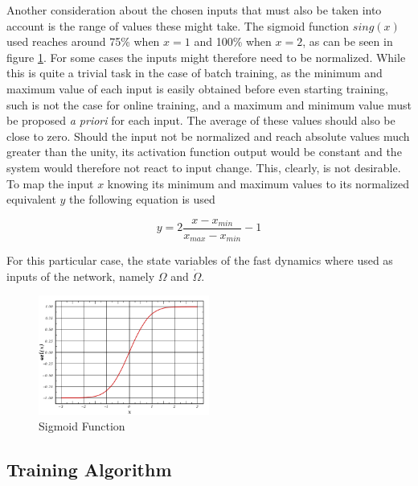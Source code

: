 Another consideration about the chosen inputs that must also be taken into account is the range of values these might take. The sigmoid function $sing(x)$ used reaches around 75\% when $x=1$ and 100\% when $x=2$, as can be seen in figure \ref{fig:sigmoid}. For some cases the inputs might therefore need to be normalized. While this is quite a trivial task in the case of batch training, as the minimum and maximum value of each input is easily obtained before even starting training, such is not the case for online training, and a maximum and minimum value must be proposed \emph{a priori} for each input. The average of these values should also be close to zero. Should the input not be normalized and reach absolute values much greater than the unity, its activation function output would be constant and the system would therefore not react to input change. This, clearly, is not desirable. To map the input $x$ knowing its minimum and maximum values to its normalized equivalent $y$ the following equation is used

\begin{equation}
y=2\dfrac{x-x_{min}}{x_{max}-x_{min}}-1
\label{eq:normalisation}
\end{equation}

For this  particular case, the state variables of the fast dynamics where used as inputs of the network, namely $\Omega$ and $\dot{\Omega}$.

\begin{figure}[!htb]
  \centering
  \includegraphics[width=0.5\textwidth]{Figures/sigmoid.png}
  \caption[Sigmoid Function]{Sigmoid Function}
  \label{fig:sigmoid}
\end{figure}

\subsection{Training Algorithm}

